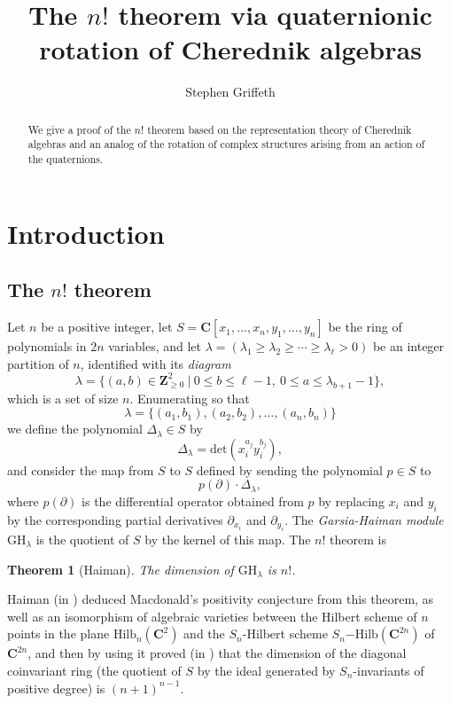 \documentclass[12pt, reqno]{amsart}
\numberwithin{equation}{section}
\theoremstyle{definition}
\theoremstyle{plain}
\newtheorem{theorem}{Theorem}[section]
\newcommand{\CC}{\mathbf{C}}
\newcommand{\ZZ}{\mathbf{Z}}
\begin{document}
\title{The $n!$ theorem via quaternionic rotation of Cherednik algebras}

\author{Stephen Griffeth}

\address{Instituto de Matem\'aticas \\ Universidad de Talca \\ sgriffeth@utalca.cl}

\maketitle

\begin{abstract}
We give a proof of the $n!$ theorem based on the representation theory of Cherednik algebras and an analog of the rotation of complex structures arising from an action of the quaternions.
\end{abstract}

\section{Introduction}

\subsection{The $n!$ theorem} Let $n$ be a positive integer, let $S=\CC[x_1,\dots,x_n,y_1,\dots,y_n]$ be the ring of polynomials in $2n$ variables, and let $\lambda=(\lambda_1 \geq \lambda_2 \geq \cdots \geq \lambda_\ell>0)$ be an integer partition of $n$, identified with its \emph{diagram}
$$\lambda=\{(a,b) \in \ZZ_{\geq 0}^2 \ | \ 0 \leq b \leq \ell-1, \  0 \leq a \leq \lambda_{b+1}-1\},$$ which is a set of size $n$. Enumerating so that
$$\lambda=\{(a_1,b_1),(a_2,b_2),\dots,(a_n,b_n) \}$$ we define the polynomial $\Delta_\lambda \in S$ by
$$\Delta_\lambda=\mathrm{det}(x_i^{a_j} y_i^{b_j}),$$ and consider the map from $S$ to $S$ defined by sending the polynomial $p \in S$ to 
$$p(\partial) \cdot \Delta_\lambda,$$ where $p(\partial)$ is the differential operator obtained from $p$ by replacing $x_i$ and $y_i$ by the corresponding partial derivatives $\partial_{x_i}$ and $\partial_{y_i}$. The \emph{Garsia-Haiman module} $\mathrm{GH}_\lambda$ is the quotient of $S$ by the kernel of this map. The $n!$ theorem is
\begin{theorem}[Haiman]
The dimension of $\mathrm{GH}_\lambda$ is $n!$. 
\end{theorem} Haiman (in \cite{Hai1}) deduced Macdonald's positivity conjecture from this theorem, as well as an isomorphism of algebraic varieties between the Hilbert scheme of $n$ points in the plane $\mathrm{Hilb}_n(\CC^2)$ and the $S_n$-Hilbert scheme $S_n\mathrm{-Hilb}(\CC^{2n})$ of $\CC^{2n}$, and then by using it proved (in \cite{Hai2}) that the dimension of the diagonal coinvariant ring (the quotient of $S$ by the ideal generated by $S_n$-invariants of positive degree) is $(n+1)^{n-1}$. 
\end{document}
